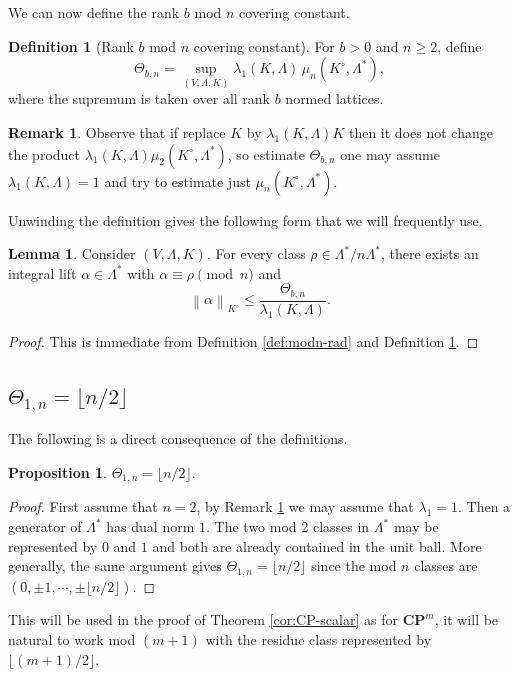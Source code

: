\documentclass[11pt,reqno]{amsart}
\numberwithin{equation}{section}
\numberwithin{equation}{section}
\theoremstyle{definition}
\newtheorem{proposition}[theorem]{Proposition}
\newtheorem{lemma}[theorem]{Lemma}
\newtheorem{remark}[theorem]{Remark}
\newtheorem{definition}[theorem]{Definition}
\newcommand{\CP}{\mathbf{CP}}
\newcommand{\norm}[1]{\left\lVert #1\right\rVert}
\begin{document}
 We can now define the rank $b$ mod $n$ covering constant.
\begin{definition}[Rank \(b\) mod \(n\) covering constant]\label{def:theta}
For \(b>0\) and \(n\ge2\), define
\[
\Theta_{b,n}
=
\sup_{(V,\Lambda,K)}
\lambda_1(K,\Lambda)\,
\mu_n(K^\circ,\Lambda^\ast),
\]
where the supremum is taken over all rank \(b\) normed lattices.
\end{definition}
\begin{remark}\label{rem:normalise}
Observe that if replace \(K\) by \(\lambda_1(K,\Lambda)K\) then it does not change the product \(\lambda_1(K,\Lambda)\mu_2(K^\circ,\Lambda^\ast)\), so estimate $\Theta_{b,n}$ one may assume \(\lambda_1(K,\Lambda)=1\) and try to estimate just \(\mu_n(K^\circ,\Lambda^\ast)\). 
\end{remark}

Unwinding the definition gives the following form that we will frequently use. 
\begin{lemma}\label{lem:theta-unwound}
Consider \((V,\Lambda,K)\). For every class \(\rho\in\Lambda^\ast/n\Lambda^\ast\), there exists an integral lift \(\alpha\in\Lambda^\ast\) with \(\alpha\equiv\rho\pmod n\) and
\[
\norm{\alpha}_{K^\circ}
\le
\frac{\Theta_{b,n}}{\lambda_1(K,\Lambda)}.
\]
\end{lemma}

\begin{proof}
This is immediate from Definition \ref{def:modn-rad} and Definition \ref{def:theta}.
\end{proof}
\subsection{$\Theta_{1,n}=\lfloor n/2\rfloor$}

The following is a direct consequence of the definitions. 
\begin{proposition}\label{prop:theta-12}
\(\Theta_{1,n}=\lfloor n/2\rfloor\).
\end{proposition}
\begin{proof}
First assume that $n=2$, by Remark \ref{rem:normalise} we may assume that $\lambda_1=1$.  Then a generator of \(\Lambda^\ast\) has dual norm \(1\). The two mod \(2\) classes  in \(\Lambda^\ast\) may be represented by \(0\) and \(1\) and both are already contained in the unit ball. More generally, the same argument gives \(\Theta_{1,n}=\lfloor n/2\rfloor\) since the mod $n$ classes are $(0, \pm1, \cdots, \pm \lfloor n/2\rfloor)$. 
\end{proof}
This will be used in the proof of Theorem \ref{cor:CP-scalar} as for $\CP^m$, it will be natural to work mod $(m+1)$ with the residue class represented by $\lfloor (m+1)/2 \rfloor$.  
\end{document}
